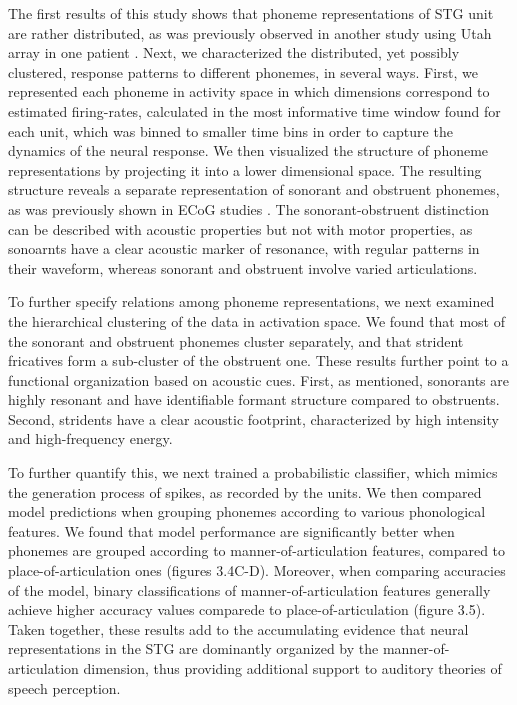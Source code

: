 The first results of this study shows that phoneme representations of STG unit are rather distributed, as was previously observed in another study using Utah array in one patient \cite{chan2013speech}. Next, we characterized the distributed, yet possibly clustered, response patterns to different phonemes, in several ways. First, we represented each phoneme in activity space in which dimensions correspond to estimated firing-rates, calculated in the most informative time window found for each unit, which was binned to smaller time bins in order to capture the dynamics of the neural response. We then visualized the structure of phoneme representations by projecting it into a lower dimensional space. The resulting structure reveals a separate representation of sonorant and obstruent phonemes, as was previously shown in ECoG studies \citep{Mesgarani2014}. The sonorant-obstruent distinction can be described with acoustic properties but not with motor properties, as sonoarnts have a clear acoustic marker of resonance, with regular patterns in their waveform, whereas sonorant and obstruent involve varied articulations.

To further specify relations among phoneme representations, we next examined the hierarchical clustering of the data in activation space. We found that most of the sonorant and obstruent phonemes cluster separately, and that strident fricatives form a sub-cluster of the obstruent one. These results further point to a functional organization based on acoustic cues. First, as mentioned, sonorants are highly resonant and have identifiable formant structure compared to obstruents. Second, stridents have a clear acoustic footprint, characterized by high intensity and high-frequency energy. 

To further quantify this, we next trained a probabilistic classifier, which mimics the generation process of spikes, as recorded by the units. We then compared model predictions when grouping phonemes according to various phonological features. We found that model performance are significantly better when phonemes are grouped according to manner-of-articulation features, compared to place-of-articulation ones (figures 3.4C-D). Moreover, when comparing accuracies of the model, binary classifications of manner-of-articulation features generally achieve higher accuracy values comparede to place-of-articulation (figure 3.5). Taken together, these results add to the accumulating evidence that neural representations in the STG are dominantly organized by the manner-of-articulation dimension, thus providing additional support to auditory theories of speech perception.

